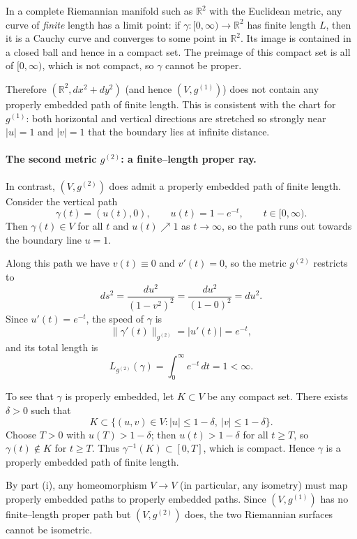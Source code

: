 \documentclass[12pt,a4paper]{article}
\theoremstyle{plain}
\theoremstyle{definition}      %
\begin{document}
	In a complete Riemannian manifold such as $\mathbb{R}^2$ with the Euclidean
	metric, any curve of \emph{finite} length has a limit point: if
	$\gamma:[0,\infty)\to\mathbb{R}^2$ has finite length $L$, then it is a
	Cauchy curve and converges to some point in $\mathbb{R}^2$.  Its image is
	contained in a closed ball and hence in a compact set.  The preimage of this
	compact set is all of $[0,\infty)$, which is not compact, so $\gamma$ cannot
	be proper.
	
	Therefore $(\mathbb{R}^2,dx^2+dy^2)$ (and hence $(V,g^{(1)})$) does not
	contain any properly embedded path of finite length.  This is consistent
	with the chart for $g^{(1)}$: both horizontal and vertical directions are
	stretched so strongly near $|u|=1$ and $|v|=1$ that the boundary lies at
	infinite distance.
	
	\paragraph{The second metric $g^{(2)}$: a finite--length proper ray.}
	In contrast, $(V,g^{(2)})$ does admit a properly embedded path of finite
	length.  Consider the vertical path
	\[
	\gamma(t) = (u(t),0),
	\qquad
	u(t) = 1 - e^{-t},
	\qquad t\in[0,\infty).
	\]
	Then $\gamma(t)\in V$ for all $t$ and $u(t)\nearrow 1$ as $t\to\infty$, so
	the path runs out towards the boundary line $u=1$.
	
	Along this path we have $v(t)\equiv 0$ and $v'(t) = 0$, so the metric
	$g^{(2)}$ restricts to
	\[
	ds^2
	= \frac{du^2}{(1-v^2)^2}
	= \frac{du^2}{(1-0)^2}
	= du^2.
	\]
	Since $u'(t) = e^{-t}$, the speed of $\gamma$ is
	\[
	\|\gamma'(t)\|_{g^{(2)}} = |u'(t)| = e^{-t},
	\]
	and its total length is
	\[
	L_{g^{(2)}}(\gamma)
	= \int_0^\infty e^{-t}\,dt
	= 1 < \infty.
	\]
	
	To see that $\gamma$ is properly embedded, let $K\subset V$ be any compact
	set.  There exists $\delta>0$ such that
	\[
	K \subset \{(u,v)\in V : |u|\le 1-\delta,\ |v|\le 1-\delta\}.
	\]
	Choose $T>0$ with $u(T) > 1-\delta$; then $u(t)>1-\delta$ for all $t\ge T$,
	so $\gamma(t)\notin K$ for $t\ge T$.  Thus
	$\gamma^{-1}(K)\subset[0,T]$, which is compact.  Hence $\gamma$ is a
	properly embedded path of finite length.
	
	By part (i), any homeomorphism $V\to V$ (in particular, any isometry)
	must map properly embedded paths to properly embedded paths.  Since
	$(V,g^{(1)})$ has no finite--length proper path but $(V,g^{(2)})$ does,
	the two Riemannian surfaces cannot be isometric.
	
\end{document}
